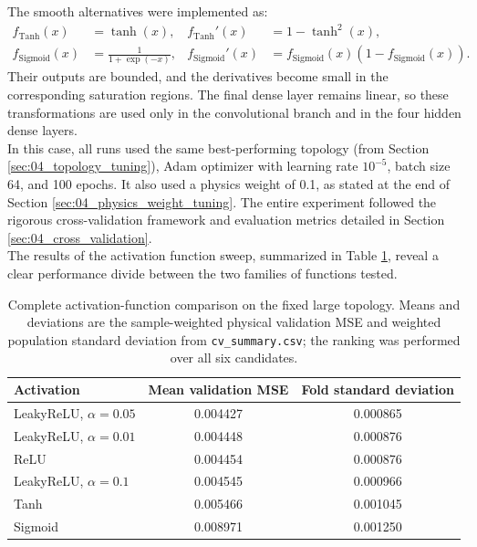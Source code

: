 The smooth alternatives were implemented as:
\begin{equation}
\begin{aligned}
    f_{\mathrm{Tanh}}(x)&=\tanh(x),
    & f_{\mathrm{Tanh}}'(x)&=1-\tanh^2(x),\\
    f_{\mathrm{Sigmoid}}(x)&=\frac{1}{1+\exp(-x)},
    & f_{\mathrm{Sigmoid}}'(x)&=f_{\mathrm{Sigmoid}}(x)\left(1-f_{\mathrm{Sigmoid}}(x)\right).
\end{aligned}
    \label{eq:04_saturating_activations}
\end{equation}
Their outputs are bounded, and the derivatives become small in the corresponding saturation regions. The final dense layer remains linear, so these transformations are used only in the convolutional branch and in the four hidden dense layers.\\

In this case, all runs used the same best-performing topology (from Section \ref{sec:04_topology_tuning}), Adam optimizer with learning rate $10^{-5}$, batch size 64, and 100 epochs. It also used a physics weight of 0.1, as stated at the end of Section \ref{sec:04_physics_weight_tuning}. The entire experiment followed the rigorous cross-validation framework and evaluation metrics detailed in Section \ref{sec:04_cross_validation}.\\

The results of the activation function sweep, summarized in Table \ref{tab:04_activation_results}, reveal a clear performance divide between the two families of functions tested.\\

\begin{table}[h!]
    \centering
    \begin{tabular}{lcc}
        \hline
        Activation & Mean validation MSE & Fold standard deviation \\
        \hline
        LeakyReLU, $\alpha=0.05$ & 0.004427 & 0.000865 \\
        LeakyReLU, $\alpha=0.01$ & 0.004448 & 0.000876 \\
        ReLU & 0.004454 & 0.000876 \\
        LeakyReLU, $\alpha=0.1$ & 0.004545 & 0.000966 \\
        Tanh & 0.005466 & 0.001045 \\
        Sigmoid & 0.008971 & 0.001250 \\
        \hline
    \end{tabular}
    \caption{Complete activation-function comparison on the fixed large topology. Means and deviations are the sample-weighted physical validation MSE and weighted population standard deviation from \texttt{cv\_summary.csv}; the ranking was performed over all six candidates.}
    \label{tab:04_activation_results}
\end{table}

